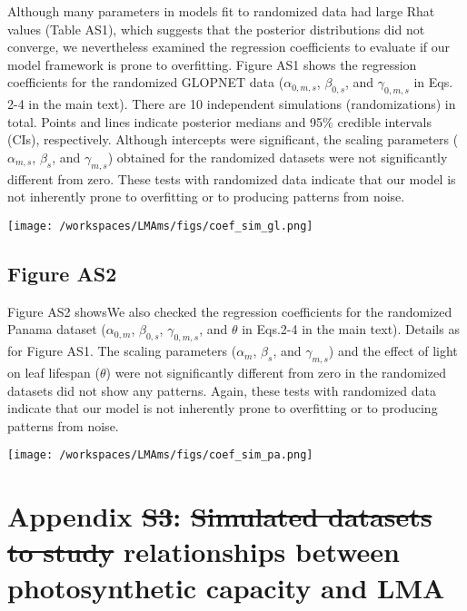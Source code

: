 \documentclass[
  12pt,
  letterpaper,
  DIV=11,
  numbers=noendperiod]{scrartcl}
\providecommand{\DIFadd}[1]{{\protect\color{blue}\uwave{#1}}} %
\providecommand{\DIFdel}[1]{{\protect\color{red}\sout{#1}}}                      %
\providecommand{\DIFaddbegin}{} %
\providecommand{\DIFaddend}{} %
\providecommand{\DIFdelbegin}{} %
\providecommand{\DIFdelend}{} %
\newcommand{\DIFscaledelfig}{0.5}
\newlength{\DIFdelgraphicswidth} %
\newlength{\DIFdelgraphicsheight} %
\newcommand{\DIFaddincludegraphics}[2][]{{\color{blue}\fbox{\DIFOincludegraphics[#1]{#2}}}} %
\newcommand{\DIFdelincludegraphics}[2][]{%
\sbox{\DIFdelgraphicsbox}{\DIFOincludegraphics[#1]{#2}}%
\settoboxwidth{\DIFdelgraphicswidth}{\DIFdelgraphicsbox} %
\settoboxtotalheight{\DIFdelgraphicsheight}{\DIFdelgraphicsbox} %
\scalebox{\DIFscaledelfig}{%
\parbox[b]{\DIFdelgraphicswidth}{\usebox{\DIFdelgraphicsbox}\\[-\baselineskip] \rule{\DIFdelgraphicswidth}{0em}}\llap{\resizebox{\DIFdelgraphicswidth}{\DIFdelgraphicsheight}{%
\setlength{\unitlength}{\DIFdelgraphicswidth}%
\begin{picture}(1,1)%
\thicklines\linethickness{2pt} %
{\color[rgb]{1,0,0}\put(0,0){\framebox(1,1){}}}%
{\color[rgb]{1,0,0}\put(0,0){\line( 1,1){1}}}%
{\color[rgb]{1,0,0}\put(0,1){\line(1,-1){1}}}%
\end{picture}%
}\hspace*{3pt}}} %
} %
\DeclareRobustCommand{\DIFaddbegin}{\DIFOaddbegin \let\includegraphics\DIFaddincludegraphics} %
\DeclareRobustCommand{\DIFaddend}{\DIFOaddend \let\includegraphics\DIFOincludegraphics} %
\DeclareRobustCommand{\DIFdelbegin}{\DIFOdelbegin \let\includegraphics\DIFdelincludegraphics} %
\DeclareRobustCommand{\DIFdelend}{\DIFOaddend \let\includegraphics\DIFOincludegraphics} %
\begin{document}
Although many parameters in models fit to randomized data had large Rhat
values (Table AS1), which suggests that the posterior distributions did
not converge, we nevertheless examined the regression coefficients to
evaluate if our model framework is prone to overfitting. Figure AS1
shows the regression coefficients for the randomized GLOPNET data
(\(\alpha_{0, m, s}\), \(\beta_{0, s}\), and \(\gamma_{0, m, s}\) in
Eqs. 2-4 in the main text). There are 10 independent simulations
(randomizations) in total. Points and lines indicate posterior medians
and 95\% credible intervals (CIs), respectively. Although intercepts
were significant, the scaling parameters (\(\alpha_{m, s}\),
\(\beta_{s}\), and \(\gamma_{m, s}\)) obtained for the randomized
datasets were not significantly different from zero. These tests with
randomized data indicate that our model is not inherently prone to
overfitting or to producing patterns from noise.

\texttt{[image: /workspaces/LMAms/figs/coef\_sim\_gl.png]}

\newpage

\subsection{Figure AS2}\label{figure-as2}

Figure AS2 showsWe also checked the regression coefficients for the
randomized Panama dataset (\(\alpha_{0, m}\), \(\beta_{0, s}\),
\(\gamma_{0, m, s}\), and \(\theta\) in Eqs.2-4 in the main text).
Details as for Figure AS1. The scaling parameters (\(\alpha_{m}\),
\(\beta_{s}\), and \(\gamma_{m, s}\)) and the effect of light on leaf
lifespan (\(\theta\)) were not significantly different from zero in the
randomized datasets did not show any patterns. Again, these tests with
randomized data indicate that our model is not inherently prone to
overfitting or to producing patterns from noise.

\texttt{[image: /workspaces/LMAms/figs/coef\_sim\_pa.png]}

\newpage

\section{Appendix \DIFdelbegin \DIFdel{S3}\DIFdelend \DIFaddbegin \DIFadd{S4}\DIFaddend : \DIFdelbegin \DIFdel{Simulated datasets to study }\DIFdelend \DIFaddbegin \DIFadd{Understanding }\DIFaddend relationships between photosynthetic
capacity and
LMA}\DIFdelbegin %
\DIFdelend \DIFaddbegin \label{appendix-s4-understanding-relationships-between-photosynthetic-capacity-and-lma}
\end{document}
